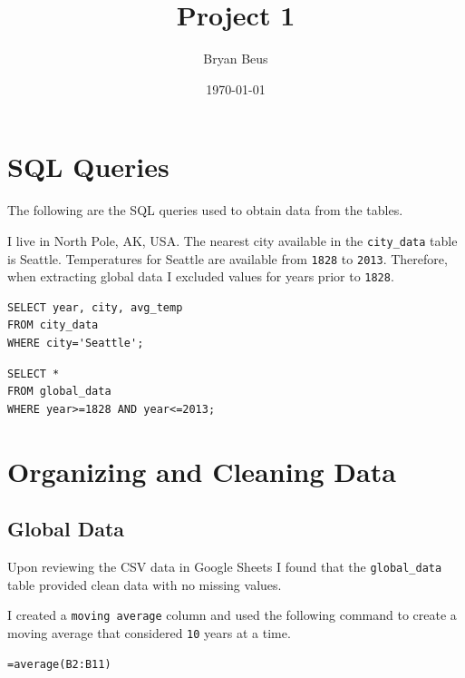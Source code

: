 \documentclass[12pt]{article}
\title{\bfseries Project 1}
\author{Bryan Beus}
\date{\today}
\begin{document}
\maketitle


\section{SQL Queries}

The following are the SQL queries used to obtain data from the tables.

I live in North Pole, AK, USA. The nearest city available in the \lstinline{city_data} table is Seattle. Temperatures for Seattle are available from \lstinline{1828} to \lstinline{2013}. Therefore, when extracting global data I excluded values for years prior to \lstinline{1828}.
 
\begin{verbatim}
SELECT year, city, avg_temp
FROM city_data
WHERE city='Seattle';
\end{verbatim}

\begin{verbatim}
SELECT *
FROM global_data
WHERE year>=1828 AND year<=2013;
\end{verbatim}

\pagebreak

\section{Organizing and Cleaning Data}

\subsection{Global Data}

Upon reviewing the CSV data in Google Sheets I found that the \lstinline{global_data} table provided clean data with no missing values.

I created a \lstinline{moving average} column and used the following command to create a moving average that considered \lstinline{10} years at a time.

\begin{verbatim}
=average(B2:B11)
\end{verbatim}
\end{document}
